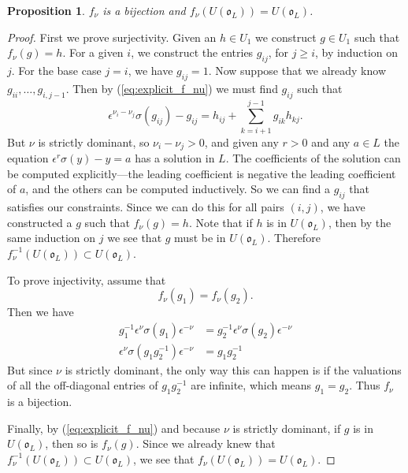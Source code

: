 \documentclass{amsart}
\newtheorem{prop}{Proposition}[subsection]
\theoremstyle{definition}
\def\O{\mathfrak{o}}
\def\e{\epsilon}
\def\s{\sigma}
\def\en{\e^{\nu}}
\def\enm{\e^{-\nu}}
\def\f{f_\nu}
\begin{document}
  \begin{prop}
    \label{prop:f_nu_bijection}
    $\f$ is a bijection and $\f(U(\O_L)) = U(\O_L)$.
  \end{prop}
  \begin{proof}
    First we prove surjectivity.  Given an $h \in U_1$ we construct $g \in U_1$
    such that $\f(g) = h$.  For a given $i$, we construct the entries $g_{ij}$,
    for $j \ge i$, by induction on $j$.  For the base case $j=i$, we have
    $g_{ij} = 1$.  Now suppose that we already know $g_{ii}, \ldots,
    g_{i,j-1}$.  Then by (\ref{eq:explicit_f_nu}) we must find $g_{ij}$ such
    that
    \begin{equation*}
      \e^{\nu_i-\nu_j}\s(g_{ij}) - g_{ij} = h_{ij} +
      \sum_{k=i+1}^{j-1} g_{ik} h_{kj}.
    \end{equation*}
    But $\nu$ is strictly dominant, so $\nu_i - \nu_j > 0$, and given any $r >
    0$ and any $a \in L$ the equation $\e^{r}\s(y) - y = a$ has a solution in
    $L$.  The coefficients of the solution can be computed explicitly---the
    leading coefficient is negative the leading coefficient of $a$, and the
    others can be computed inductively.  So we can find a $g_{ij}$ that
    satisfies our constraints.  Since we can do this for all pairs $(i,j)$, we
    have constructed a $g$ such that $\f(g) = h$.  Note that if $h$ is in
    $U(\O_L)$, then by the same induction on $j$ we see that $g$ must be in
    $U(\O_L)$.  Therefore $\f^{-1}(U(\O_L)) \subset U(\O_L)$.

    To prove injectivity, assume that
    \begin{equation*}
      \f(g_1) = \f(g_2).
    \end{equation*}
    Then we have
    \begin{align*}
      g_1^{-1}\en\s(g_1)\enm &= g_2^{-1}\en\s(g_2)\enm \\
      \en\s(g_1 g_2^{-1})\enm &= g_1 g_2^{-1}
    \end{align*}
    But since $\nu$ is strictly dominant, the only way this can happen is if
    the valuations of all the off-diagonal entries of $g_1 g_2^{-1}$ are
    infinite, which means $g_1 = g_2$.  Thus $\f$ is a bijection.

    Finally, by (\ref{eq:explicit_f_nu}) and because $\nu$ is strictly
    dominant, if $g$ is in $U(\O_L)$, then so is $\f(g)$.  Since we already
    knew that $\f^{-1}(U(\O_L)) \subset U(\O_L)$, we see that $\f(U(\O_L)) =
    U(\O_L)$.
  \end{proof}
\end{document}
